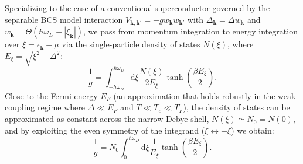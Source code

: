 Specializing to the case of a conventional superconductor governed by the separable BCS model interaction \( V_{\mathbf{k},\mathbf{k}'} = -g w_{\mathbf{k}} w_{\mathbf{k}'} \) with \( \Delta_{\mathbf{k}} = \Delta w_{\mathbf{k}} \) and \( w_{\mathbf{k}} = \Theta(\hbar\omega_D - |\xi_{\mathbf{k}}|) \), we pass from momentum integration to energy integration over \( \xi = \epsilon_{\mathbf{k}} - \mu \) via the single-particle density of states \( N(\xi) \), where \( E_\xi = \sqrt{\xi^2 + \Delta^2} \):
\[
    \frac{1}{g} = \int_{-\hbar\omega_D}^{\hbar\omega_D} \mathrm{d}\xi \frac{N(\xi)}{2E_\xi} \tanh\left(\frac{\beta E_\xi}{2}\right).
\]
Close to the Fermi energy \( E_F \) (an approximation that holds robustly in the weak-coupling regime where \( \Delta \ll E_F \) and \( T \ll T_c \ll T_F \)), the density of states can be approximated as constant across the narrow Debye shell, \( N(\xi) \simeq N_0 = N(0) \), and by exploiting the even symmetry of the integrand (\( \xi \leftrightarrow -\xi \)) we obtain:
\[
    \frac{1}{g} = N_0 \int_{0}^{\hbar\omega_D} \mathrm{d}\xi \frac{1}{E_\xi} \tanh\left(\frac{\beta E_\xi}{2}\right).
\]


